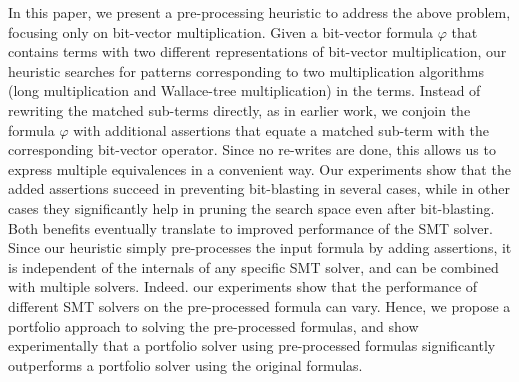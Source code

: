 In this paper, we present a pre-processing heuristic to address the
above problem, focusing only on bit-vector multiplication.  Given a
bit-vector formula $\varphi$ that contains terms with two different
representations of bit-vector multiplication, our heuristic searches
for patterns corresponding to two multiplication algorithms (long
multiplication and Wallace-tree multiplication) in the terms. Instead
of rewriting the matched sub-terms directly, as in earlier work, we
conjoin the formula $\varphi$ with additional assertions that equate a
matched sub-term with the corresponding bit-vector operator.  Since no
re-writes are done, this allows us to express multiple equivalences in
a convenient way.  Our experiments show that the added assertions
succeed in preventing bit-blasting in several cases, while in other
cases they significantly help in pruning the search space even after
bit-blasting.  Both benefits eventually translate to improved
performance of the SMT solver.  Since our heuristic simply
pre-processes the input formula by adding assertions, it is
independent of the internals of any specific SMT solver, and can be
combined with multiple solvers.  Indeed.  our experiments show that
the performance of different SMT solvers on the pre-processed formula
can vary.  Hence, we propose a portfolio approach to solving the
pre-processed formulas, and show experimentally that a portfolio
solver using pre-processed formulas significantly outperforms a
portfolio solver using the original formulas.



%
